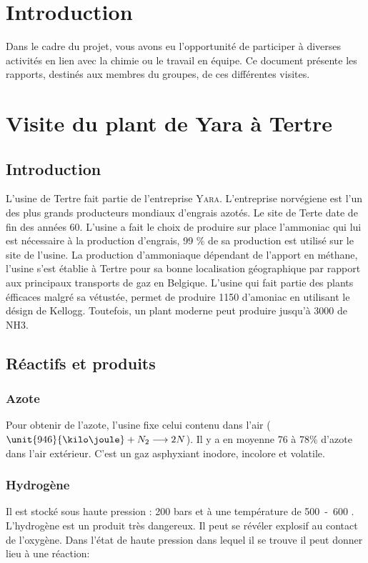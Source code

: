 

\section{Introduction}
Dans le cadre du projet, vous avons eu l'opportunité de
participer à diverses activités en lien avec la chimie ou
le travail en équipe. Ce document présente les rapports,
destinés aux membres du groupes, de ces différentes visites.

\section{Visite du plant de Yara à Tertre}

\subsection{Introduction}
L’usine de Tertre fait partie de l’entreprise \textsc{Yara}. L’entreprise norvégiene est l’un des plus grands producteurs
mondiaux d’engrais azotés. Le site de Terte date de fin des années 60. L’usine a fait le choix de produire sur place 
l’ammoniac qui lui est nécessaire à la production d’engrais, 99 \%  de sa production est utilisé sur le site de l’usine. 
La production d’ammoniaque dépendant de l’apport en méthane, l’usine s’est établie à Tertre pour sa bonne localisation 
géographique par rapport aux principaux transports de gaz en Belgique. L'usine qui fait partie des plants éfficaces malgré 
sa vétustée, permet de produire \unit{1150}{\ton\per\dday} d’amoniac en utilisant le désign de Kellogg. 
Toutefois, un plant moderne peut produire jusqu’à \unit{3000}{\ton\per\dday} de NH3.

\subsection{Réactifs et produits}

\subsubsection{Azote}

Pour obtenir de l’azote, l’usine fixe celui contenu dans l’air ($\unit{946}{\kilo\joule} + N_2 \longrightarrow 2N$). 
Il y a en moyenne 76 à 78\% d’azote dans l’air extérieur. C’est un gaz asphyxiant inodore, incolore et volatile. 

\subsubsection{Hydrogène}
Il est stocké sous haute pression : 200 bars et à une température de \unit{500-600} {\degreeCelsius}.
L’hydrogène est un produit très dangereux. Il peut se révéler explosif au contact de l’oxygène. Dans l’état de haute 
pression dans lequel il se trouve il peut donner lieu à une réaction: 

